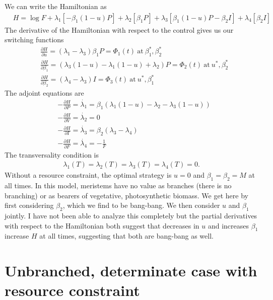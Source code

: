 \documentclass[12pt, oneside]{article}   	%
\begin{document}
We can write the Hamiltonian as
%
\begin{align}
& H = \log F + \lambda_1 [ - \beta_1 (1-u) P ] + \lambda_2 [ \beta_1 P ]  + \lambda_3 [ \beta_1 (1-u) P - \beta_2 I ] + \lambda_4 [ \beta_2 I ] 
\end{align}
%
The derivative of the Hamiltonian with respect to the control gives us our switching functions
%
\begin{align}
& \frac{\partial H}{\partial u} = (\lambda_1 - \lambda_3) \beta_1 P = \Phi_1(t) \ \mathrm{at}\ \beta_1^*, \beta_2^* \\
&\frac{\partial H}{\partial \beta_1} =  (\lambda_3(1-u) - \lambda_1 (1-u) + \lambda_2 ) P = \Phi_2(t) \ \mathrm{at}\ u^*, \beta_2^* \\
&\frac{\partial H}{\partial \beta_2} =  (\lambda_4 - \lambda_3) I = \Phi_3(t) \ \mathrm{at}\ u^*, \beta_1^*
\end{align}
%
The adjoint equations are
%
\begin{align}
&-\frac{\partial H}{\partial P} = \dot{\lambda_1}  = \beta_1 ( \lambda_1 (1-u) - \lambda_2 - \lambda_3 (1-u) ) \nonumber \\
&-\frac{\partial H}{\partial V} = \dot{\lambda_2}  = 0  \nonumber\\
&-\frac{\partial H}{\partial I} = \dot{\lambda_3}  = \beta_2(\lambda_3-\lambda_4) \nonumber \\
&-\frac{\partial H}{\partial F} = \dot{\lambda_4}  = -\frac{1}{F}  
\end{align}
The transversality condition is
%
\begin{align}
\lambda_1(T) = \lambda_2(T) = \lambda_3(T) = \lambda_4(T) = 0.
\end{align}
%
Without a resource constraint, the optimal strategy is $u=0$ and $\beta_1=\beta_2=M$ at all times. In this model, meristems have no value as branches (there is no branching) or as bearers of vegetative, photosynthetic biomass. We get here by first considering $\beta_2$, which we find to be bang-bang. We then consider $u$ and $\beta_1$ jointly. I have not been able to analyze this completely but the partial derivatives with respect to the Hamiltonian both suggest that decreases in $u$ and increases $\beta_1$ increase $H$ at all times, suggesting that both are bang-bang as well.

\clearpage
\newpage

\section*{Unbranched, determinate case with resource constraint}
\end{document}
